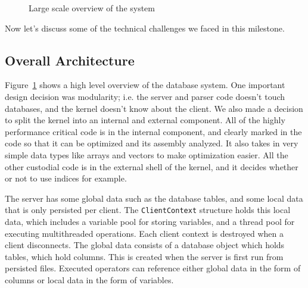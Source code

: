 \documentclass[a4paper, 12pt]{article}
\begin{document}
\begin{figure}[ht]
\begin{center}
\end{center}
\caption{Large scale overview of the system}
\label{fig:overview}
\end{figure}

\medskip
Now let's discuss some of the technical challenges we faced in this milestone.

\subsection{Overall Architecture}

Figure~\ref{fig:overview} shows a high level overview of the database system. One important design decision was modularity; i.e. the server and parser code doesn't touch databases, and the kernel doesn't know about the client. We also made a decision to split the kernel into an internal and external component. All of the highly performance critical code is in the internal component, and clearly marked in the code so that it can be optimized and its assembly analyzed. It also takes in very simple data types like arrays and vectors to make optimization easier. All the other custodial code is in the external shell of the kernel, and it decides whether or not to use indices for example. 

\medskip
The server has some global data such as the database tables, and some local data that is only persisted per client. The \texttt{ClientContext} structure holds this local data, which includes a variable pool for storing variables, and a thread pool for executing multithreaded operations. Each client context is destroyed when a client disconnects. The global data consists of a database object which holds tables, which hold columns. This is created when the server is first run from persisted files. Executed operators can reference either global data in the form of columns or local data in the form of variables.
\end{document}

